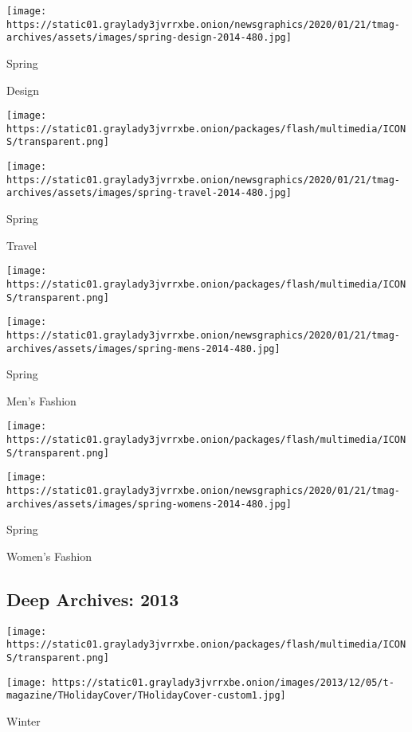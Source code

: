 \texttt{[image: https://static01.graylady3jvrrxbe.onion/newsgraphics/2020/01/21/tmag-archives/assets/images/spring-design-2014-480.jpg]}

Spring

Design

\href{https://www.nytimes3xbfgragh.onion/indexes/2014/03/23/t-magazine/travel-issue/index.html}{}

\texttt{[image: https://static01.graylady3jvrrxbe.onion/packages/flash/multimedia/ICONS/transparent.png]}

\texttt{[image: https://static01.graylady3jvrrxbe.onion/newsgraphics/2020/01/21/tmag-archives/assets/images/spring-travel-2014-480.jpg]}

Spring

Travel

\href{https://www.nytimes3xbfgragh.onion/indexes/2014/03/09/t-magazine/mens-fashion-issue/index.html}{}

\texttt{[image: https://static01.graylady3jvrrxbe.onion/packages/flash/multimedia/ICONS/transparent.png]}

\texttt{[image: https://static01.graylady3jvrrxbe.onion/newsgraphics/2020/01/21/tmag-archives/assets/images/spring-mens-2014-480.jpg]}

Spring

Men's Fashion

\href{https://www.nytimes3xbfgragh.onion/indexes/2014/02/16/t-magazine/womens-fashion-issue/index.html}{}

\texttt{[image: https://static01.graylady3jvrrxbe.onion/packages/flash/multimedia/ICONS/transparent.png]}

\texttt{[image: https://static01.graylady3jvrrxbe.onion/newsgraphics/2020/01/21/tmag-archives/assets/images/spring-womens-2014-480.jpg]}

Spring

Women's Fashion

\hypertarget{deep-archives-2013}{%
\subsection{Deep Archives: 2013}\label{deep-archives-2013}}

\texttt{[image: https://static01.graylady3jvrrxbe.onion/packages/flash/multimedia/ICONS/transparent.png]}

\texttt{[image: https://static01.graylady3jvrrxbe.onion/images/2013/12/05/t-magazine/THolidayCover/THolidayCover-custom1.jpg]}

Winter

